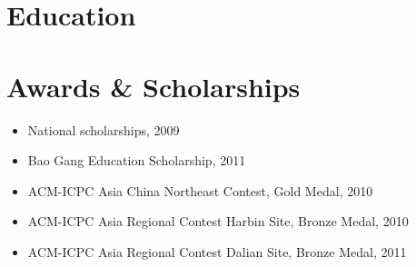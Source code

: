 \documentclass[11pt,a4paper,sans]{moderncv}
\begin{document}
\section{Education}

\section{Awards \& Scholarships}
\begin{itemize}
    \item National scholarships, 2009
    \item Bao Gang Education Scholarship, 2011
    \item ACM-ICPC Asia China Northeast Contest, Gold Medal, 2010
    \item ACM-ICPC Asia Regional Contest Harbin Site, Bronze Medal, 2010
    \item ACM-ICPC Asia Regional Contest Dalian Site, Bronze Medal, 2011
\end{itemize}
\end{document}

